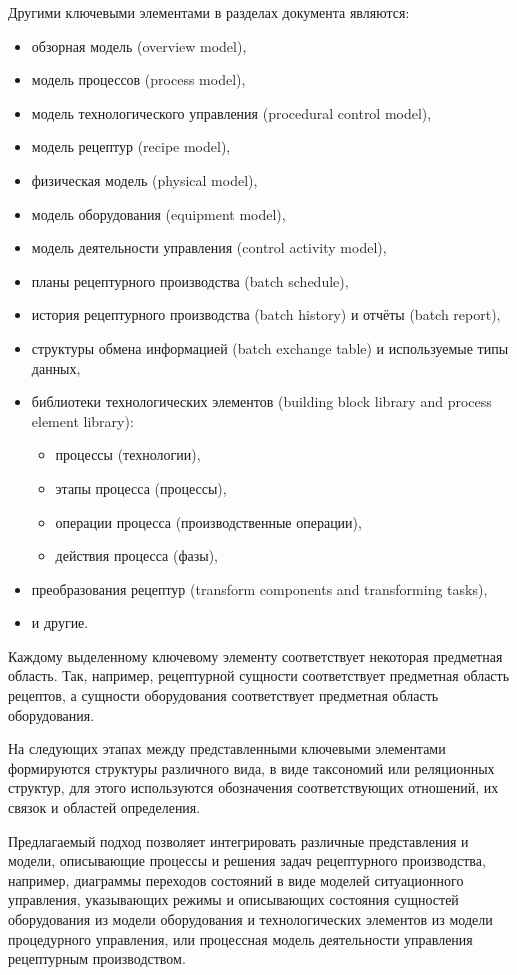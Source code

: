 Другими ключевыми элементами в разделах документа являются:
\begin{itemize}
    \item обзорная модель (overview model),
    \item модель процессов (process model),
    \item модель технологического управления (procedural control model),
    \item модель рецептур (recipe model),
    \item физическая модель (physical model),
    \item модель оборудования (equipment model),
    \item модель деятельности управления (control activity model),
    \item планы рецептурного производства (batch schedule),
    \item история рецептурного производства (batch history) и отчёты (batch report),
    \item структуры обмена информацией (batch exchange table) и используемые типы данных,
    \item библиотеки технологических элементов (building block library and process element library):
          \begin{itemize}
              \item процессы (технологии),
              \item этапы процесса (процессы),
              \item операции процесса (производственные операции),
              \item действия процесса (фазы),
          \end{itemize}
    \item преобразования рецептур (transform components and transforming tasks),
    \item и другие.
\end{itemize}

Каждому выделенному ключевому элементу соответствует некоторая предметная область. Так, например, рецептурной сущности соответствует предметная область рецептов, а сущности оборудования соответствует предметная область оборудования.

На следующих этапах между представленными ключевыми элементами формируются структуры различного вида, в виде таксономий или реляционных структур, для этого используются обозначения соответствующих отношений, их связок и областей определения.

Предлагаемый подход позволяет интегрировать различные представления и модели, описывающие процессы и решения задач рецептурного производства, например, диаграммы переходов состояний в виде моделей ситуационного управления, указывающих режимы и описывающих состояния сущностей оборудования из модели оборудования и технологических элементов из модели процедурного управления, или процессная модель деятельности управления рецептурным производством.

